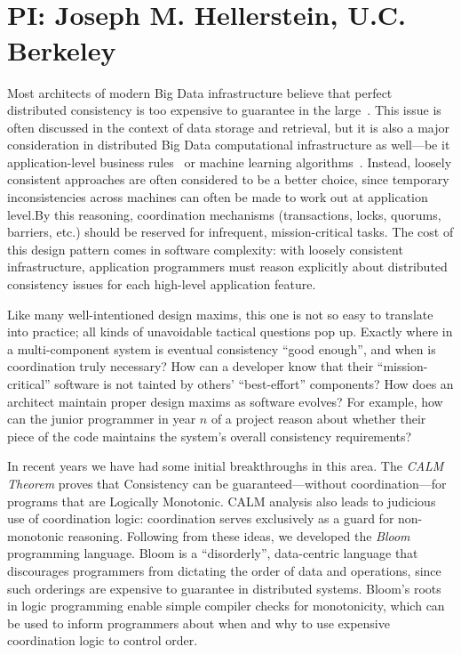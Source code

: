 \vspace{-2pt}
\section*{\mytitle\\
{\normalsize PI: Joseph M. Hellerstein, U.C. Berkeley}}
Most architects of modern Big Data infrastructure believe that perfect distributed consistency is too expensive to guarantee in the large~\cite{ladisreport}.  This issue is often discussed in the context of data storage and retrieval, but it is also a major consideration in distributed Big Data computational infrastructure as well---be it application-level business rules~\cite{finkelstein2011} or machine learning algorithms~\cite{hogwild}.  Instead, loosely consistent approaches are often considered to be a better choice, since temporary inconsistencies across machines can often be made to work out at application level.By this reasoning, coordination mechanisms (transactions, locks, quorums, barriers, etc.) should be reserved for infrequent, mission-critical tasks.  The cost of this design pattern comes in software complexity: with loosely consistent infrastructure, application programmers must reason explicitly about distributed consistency issues for each high-level application feature.

Like many well-intentioned design maxims, this one is not so easy to translate into practice; all kinds of unavoidable tactical questions pop up.  Exactly where in a multi-component system is eventual consistency “good enough”, and when is coordination truly necessary?  How can a developer know that their “mission-critical” software is not tainted by others' ``best-effort'' components?  How does an architect maintain proper design maxims as software evolves? For example, how can the junior programmer in year $n$ of a project reason about whether their piece of the code maintains the system's overall consistency requirements?

In recent years we have had some initial breakthroughs in this area.  The \emph{CALM Theorem} proves that Consistency can be guaranteed---without coordination---for programs that are Logically Monotonic. CALM analysis also leads to judicious use of coordination logic: coordination serves exclusively as a guard for non-monotonic reasoning.  Following from these ideas, we developed the \emph{Bloom} programming language.  Bloom is a ``disorderly'', data-centric language that discourages programmers from dictating the order of data and operations, since such orderings are expensive to guarantee in distributed systems.  Bloom's roots in logic programming enable simple compiler checks for monotonicity, which can be used to inform programmers about when and why to use expensive coordination logic to control order.

